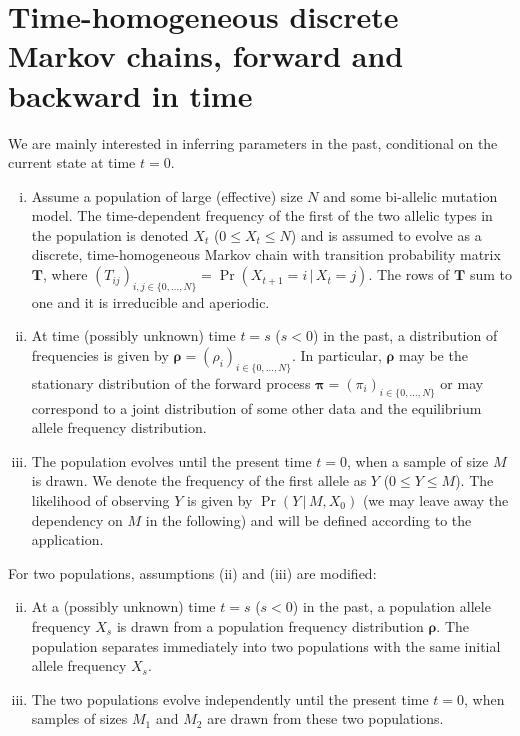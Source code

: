 \documentclass[preprint]{elsarticle}
\newcommand{\bs}[1]{\ensuremath{\boldsymbol{#1}}}
\newcommand\given{{\,|\,}}
\newcommand\x[1]{\ensuremath{X_{#1}}}
\newcommand\y{\ensuremath{Y}}
\newcommand\s{\ensuremath{s}}
\begin{document}


\section{Time-homogeneous discrete Markov chains, forward and backward in time}

We are mainly interested in inferring parameters in the past, conditional on the current state at time $t=0$. 

\begin{enumerate}[(i)]
\item Assume a population of large (effective) size $N$ and some bi-allelic mutation model. The time-dependent frequency of the first of the two allelic types in the population is denoted $\x{t}$ ($0 \le \x{t} \le N$) and is assumed to evolve as a discrete, time-homogeneous Markov chain with transition probability matrix $\mathbf{T}$, where $(T_{ij})_{i,j \in \{0, \ldots, N\}} = \Pr(\x{t+1}=i \given \x{t}=j)$.  The rows of $\mathbf{T}$ sum to one and it is irreducible and aperiodic.
\item At time (possibly unknown) time $t=\s$ ($\s<0$) in the past, a distribution of frequencies is given by $\bs{\rho} = (\rho_{i})_{i \in \{0, \ldots, N\}}$.
In particular, $\bs{\rho}$ may be the stationary distribution of the forward process $\bs{\pi}=(\pi_i)_{i \in \{0, \ldots, N\}}$ or may correspond to a joint distribution of some other data and the equilibrium allele frequency distribution. 
\item The population evolves until the present time $t=0$, when a sample of size $M$ is drawn.  We denote the frequency of the first allele as $\y$ ($0 \le \y \le M$). The likelihood of observing $\y$ is given by $\Pr(\y \given M, \x{0})$ (we may leave away the dependency on $M$ in the following) and will be defined according to the application.
\end{enumerate}

For two populations, assumptions (ii) and (iii) are modified:
\begin{enumerate}[(i)]
\setcounter{enumi}{1}
\item At a (possibly unknown) time $t=\s$ ($\s<0$) in the past, a population allele frequency $\x{\s}$ is drawn from a population frequency distribution $\bs{\rho}$. The population separates immediately into two populations with the same initial allele frequency $\x{\s}$. 
\item The two populations evolve independently until the present time $t=0$, when samples of sizes $M_1$ and $M_2$ are drawn from these two populations.
\end{enumerate}
\end{document}
